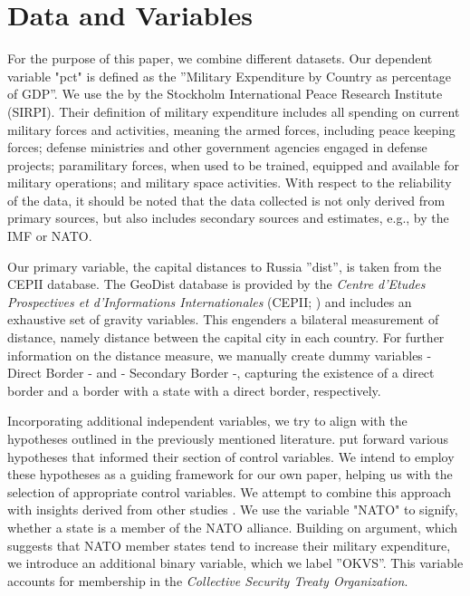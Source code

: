 \documentclass[12pt,a4paper]{article}
\begin{document}
\section{Data and Variables}
For the purpose of this paper, we combine different datasets. Our dependent variable "pct" is defined as the ''Military Expenditure by Country as percentage of GDP''. We use the \citet{SIRPI} by the Stockholm International Peace Research Institute (SIRPI). Their definition of military expenditure includes all spending on current military forces and activities, meaning the armed forces, including peace keeping forces; defense ministries and other government agencies engaged in defense projects; paramilitary forces, when used to be trained, equipped and available for military operations; and military space activities. With respect to the reliability of the data, it should be noted that the data collected is not only derived from primary sources, but also includes secondary sources and estimates, e.g., by the IMF or NATO. 

Our primary variable, the capital distances to Russia ''dist'', is taken from the CEPII database. The GeoDist database is provided by the \textit{Centre d’Etudes Prospectives et d’Informations Internationales} (CEPII; \citealp{mayer2011}) and includes an exhaustive set of gravity variables. This engenders a bilateral measurement of distance, namely distance between the capital city in each country. For further information on the distance measure, we manually create dummy variables - Direct Border - and - Secondary Border -, capturing the existence of a direct border and a border with a state with a direct border, respectively.

Incorporating additional independent variables, we try to align with the hypotheses outlined in the previously mentioned literature. \citet{kofrovn2023} put forward various hypotheses that informed their section of control variables. We intend to employ these hypotheses as a guiding framework for our own paper, helping us with the selection of appropriate control variables. We attempt to combine this approach with insights derived from other studies \citep{nordhaus2012,lin2019}. We use the variable "NATO" to signify, whether a state is a member of the NATO alliance. Building on \citet{kofrovn2023} argument, which suggests that NATO member states tend to increase their military expenditure, we introduce an additional binary variable, which we label ''OKVS''. This variable accounts for membership in the \textit{Collective Security Treaty Organization}. 
\end{document}
